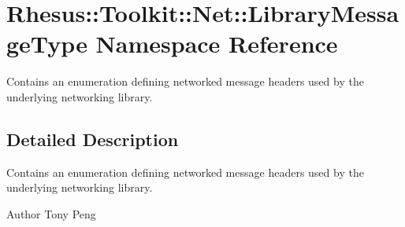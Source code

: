 \hypertarget{namespace_rhesus_1_1_toolkit_1_1_net_1_1_library_message_type}{\section{Rhesus\-:\-:Toolkit\-:\-:Net\-:\-:Library\-Message\-Type Namespace Reference}
\label{namespace_rhesus_1_1_toolkit_1_1_net_1_1_library_message_type}
}


Contains an enumeration defining networked message headers used by the underlying networking library.  




\subsection{Detailed Description}
Contains an enumeration defining networked message headers used by the underlying networking library. \begin{DoxyAuthor}{Author}
Tony Peng 
\end{DoxyAuthor}
